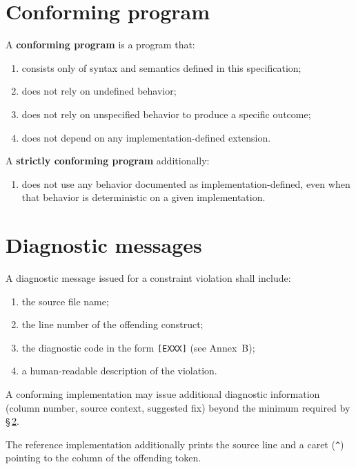 \section{Conforming program}
\label{sec:conformance.program}

\pnum
A \textbf{conforming program} is a program that:

\begin{enumerate}
  \item consists only of syntax and semantics defined in this
        specification;
  \item does not rely on undefined behavior;
  \item does not rely on unspecified behavior to produce a specific outcome;
  \item does not depend on any implementation-defined extension.
\end{enumerate}

\pnum
A \textbf{strictly conforming program} additionally:

\begin{enumerate}
  \item does not use any behavior documented as implementation-defined,
        even when that behavior is deterministic on a given implementation.
\end{enumerate}

\section{Diagnostic messages}
\label{sec:conformance.diagnostics}

\pnum
A diagnostic message issued for a constraint violation shall include:

\begin{enumerate}
  \item the source file name;
  \item the line number of the offending construct;
  \item the diagnostic code in the form \texttt{[EXXX]} (see Annex~B);
  \item a human-readable description of the violation.
\end{enumerate}

\pnum
A conforming implementation may issue additional diagnostic information
(column number, source context, suggested fix) beyond the minimum required
by \S\,\ref{sec:conformance.diagnostics}.

\begin{note}
  The reference implementation additionally prints the source line and a
  caret (\texttt{\^{}}) pointing to the column of the offending token.
\end{note}

